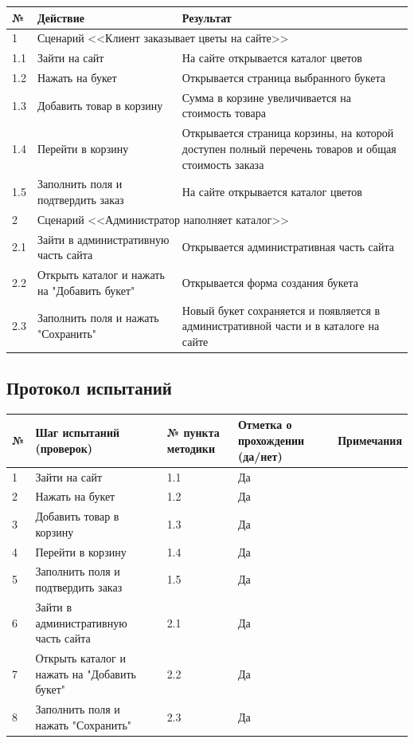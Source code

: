 \begin{table}[H]
		\begin{tabular}{|l|p{7cm}|p{7cm}|}
			\hline
			№ & Действие & Результат \\ \hline
			1 & \multicolumn{2}{p{9cm}|}{Сценарий <<Клиент заказывает цветы на сайте>>} \\ \hline
			1.1 & Зайти на сайт & На сайте открывается каталог цветов \\ \hline
			1.2 & Нажать на букет & Открывается страница выбранного букета \\ \hline
			1.3 & Добавить товар в корзину & Сумма в корзине увеличивается на стоимость товара \\ \hline
			1.4 & Перейти в корзину & Открывается страница корзины, на которой доступен полный перечень товаров и общая стоимость заказа \\ \hline
			1.5 & Заполнить поля и подтвердить заказ & На сайте открывается каталог цветов \\ \hline
			2 & \multicolumn{2}{p{9cm}|}{Сценарий <<Администратор наполняет каталог>>} \\ \hline
			2.1 & Зайти в административную часть сайта & Открывается административная часть сайта \\ \hline
			2.2 & Открыть каталог и нажать на "Добавить букет" & Открывается форма создания букета \\ \hline
			2.3 & Заполнить поля и нажать "Сохранить" & Новый букет сохраняется и появляется в административной части и в каталоге на сайте \\ \hline									
		\end{tabular}
\end{table}


\subsection{Протокол испытаний}

\begin{table}[H]
	\begin{tabular}{|l|p{5cm}|p{3cm}|p{3cm}|p{3cm}|}
		\hline
		№ & Шаг испытаний (проверок) & № пункта
методики
 & Отметка о прохождении (да/нет) & Примечания \\ \hline
		1 & Зайти на сайт & 1.1 & Да & \\ \hline
		2 & Нажать на букет & 1.2 & Да & \\ \hline
		3 & Добавить товар в корзину & 1.3 & Да & \\ \hline
		4 & Перейти в корзину & 1.4 & Да & \\ \hline
		5 & Заполнить поля и подтвердить заказ & 1.5 & Да & \\ \hline
		6 & Зайти в административную часть сайта & 2.1 & Да & \\ \hline
		7 & Открыть каталог и нажать на "Добавить букет" & 2.2 & Да & \\ \hline
		8 & Заполнить поля и нажать "Сохранить" & 2.3 & Да & \\ \hline
	\end{tabular}
\end{table}